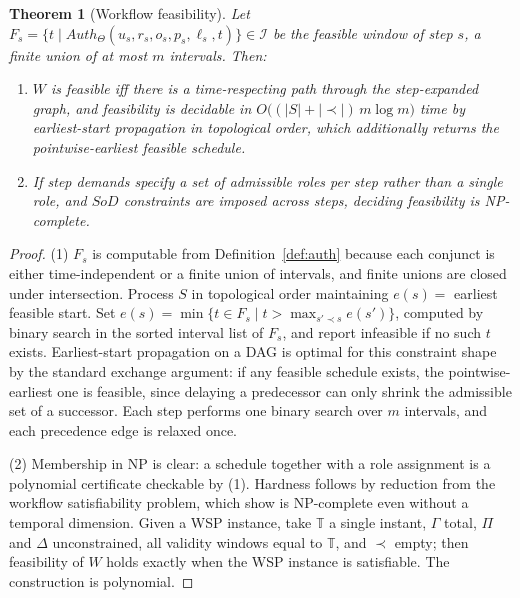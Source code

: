 \documentclass[11pt]{article}
\theoremstyle{definition}
\theoremstyle{plain}
\newtheorem{theorem}{Theorem}
\theoremstyle{remark}
\newcommand{\Auth}{\mathit{Auth}}
\newcommand{\SoD}{\mathit{SoD}}
\newcommand{\Tdom}{\mathbb{T}}
\begin{document}
\begin{theorem}[Workflow feasibility]
\label{thm:workflow}
Let $F_s = \{ t \mid \Auth_\Theta(u_s,r_s,o_s,p_s,\ell_s,t) \} \in \mathcal{I}$
be the feasible window of step $s$, a finite union of at most $m$ intervals.
Then:
\begin{enumerate}
  \item $W$ is feasible iff there is a time-respecting path through the
        step-expanded graph, and feasibility is decidable in
        $O\bigl((|S| + |{\prec}|)\, m \log m\bigr)$ time by earliest-start
        propagation in topological order, which additionally returns the
        pointwise-earliest feasible schedule.
  \item If step demands specify a \emph{set} of admissible roles per step rather
        than a single role, and $\SoD$ constraints are imposed across steps,
        deciding feasibility is NP-complete.
\end{enumerate}
\end{theorem}

\begin{proof}
(1) $F_s$ is computable from Definition~\ref{def:auth} because each conjunct is
either time-independent or a finite union of intervals, and finite unions are
closed under intersection. Process $S$ in topological order maintaining
$e(s) = $ earliest feasible start. Set
$e(s) = \min \{ t \in F_s \mid t > \max_{s' \prec s} e(s') \}$, computed by
binary search in the sorted interval list of $F_s$, and report infeasible if no
such $t$ exists. Earliest-start propagation on a DAG is optimal for this
constraint shape by the standard exchange argument: if any feasible schedule
exists, the pointwise-earliest one is feasible, since delaying a predecessor can
only shrink the admissible set of a successor. Each step performs one binary
search over $m$ intervals, and each precedence edge is relaxed once.

(2) Membership in NP is clear: a schedule together with a role assignment is a
polynomial certificate checkable by (1). Hardness follows by reduction from the
workflow satisfiability problem, which \citet{wang2010wsp} show is NP-complete
even without a temporal dimension. Given a WSP instance, take $\Tdom$ a single
instant, $\Gamma$ total, $\Pi$ and $\Delta$ unconstrained, all validity windows
equal to $\Tdom$, and $\prec$ empty; then feasibility of $W$ holds exactly when
the WSP instance is satisfiable. The construction is polynomial.
\end{proof}
\end{document}
